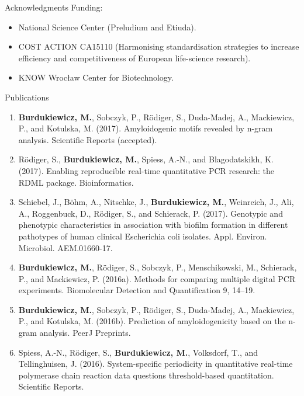 \documentclass{beamer}\usepackage[]{graphicx}\usepackage[]{color}
\begin{document}
\begin{frame}{Acknowledgments}
Funding:
\begin{itemize}
\item National Science Center (Preludium and Etiuda).
\item COST ACTION CA15110 (Harmonising standardisation strategies to increase efficiency and competitiveness of European life-science research).
\item KNOW Wrocław Center for Biotechnology.
\end{itemize}

\end{frame}

\begin{frame}[allowframebreaks]{Publications}

\small
\begin{enumerate}
\item \textbf{Burdukiewicz, M.}, Sobczyk, P., Rödiger, S., Duda-Madej, A., Mackiewicz, P., and Kotulska, M. (2017). Amyloidogenic motifs revealed by n-gram analysis. Scientific Reports (accepted).

\item Rödiger, S., \textbf{Burdukiewicz, M.}, Spiess, A.-N., and Blagodatskikh, K. (2017). Enabling reproducible real-time quantitative PCR research: the RDML package. Bioinformatics.

\item Schiebel, J., Böhm, A., Nitschke, J., \textbf{Burdukiewicz, M.}, Weinreich, J., Ali, A., Roggenbuck, D., Rödiger, S., and Schierack, P. (2017). Genotypic and phenotypic characteristics in association with biofilm formation in different pathotypes of human clinical Escherichia coli isolates. Appl. Environ. Microbiol. AEM.01660-17.

\item \textbf{Burdukiewicz, M.}, Rödiger, S., Sobczyk, P., Menschikowski, M., Schierack, P., and Mackiewicz, P. (2016a). Methods for comparing multiple digital PCR experiments. Biomolecular Detection and Quantification 9, 14–19.

\item \textbf{Burdukiewicz, M.}, Sobczyk, P., Rödiger, S., Duda-Madej, A., Mackiewicz, P., and Kotulska, M. (2016b). Prediction of amyloidogenicity based on the n-gram analysis. PeerJ Preprints.

\item Spiess, A.-N., Rödiger, S., \textbf{Burdukiewicz, M.}, Volksdorf, T., and Tellinghuisen, J. (2016). System-specific periodicity in quantitative real-time polymerase chain reaction data questions threshold-based quantitation. Scientific Reports.


\end{enumerate}
\end{frame}
\end{document}
